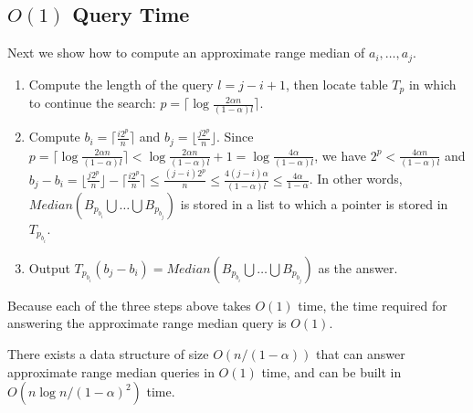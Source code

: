 \documentclass{llncs}
\begin{document}
\subsection{$O(1)$ Query Time}
Next we show how to compute an approximate range median of
$a_i,\ldots,a_j$.
\begin{enumerate}
\item Compute the length of the query $l=j-i+1$, then locate table $T_p$ in which to 
continue the search: $p=\lceil \log\frac{2 \alpha n}{(1-\alpha)l} \rceil$.
\item Compute $b_i=\lceil \frac{i 2^p}{n} \rceil$ and $b_j=\lfloor
  \frac{j 2^p}{n} \rfloor$. Since 
$p=\lceil \log\frac{2 \alpha n}{(1-\alpha)l}\rceil < \log\frac{2
  \alpha n}{(1-\alpha)l}+ 1 = \log\frac{4 \alpha}{(1-\alpha)l}$, 
we have $2^p < \frac{4 \alpha n}{(1-\alpha)l}$ and
$b_j - b_i = \lfloor \frac{j 2^p}{n} \rfloor - \lceil \frac{i 2^p}{n}
 \rceil \leq \frac{(j-i)2^p}{n} \leq \frac{4(j-i)\alpha}{(1-\alpha)l}
 \leq \frac{4 \alpha}{1-\alpha} $. In other words, $Median(B_{p_{b_i}} 
\bigcup \ldots \bigcup B_{p_{b_j}}) $ 
is stored in a list to which a pointer is stored in $T_{p_{b_i}}$.
\item Output $T_{p_{b_i}}(b_j-b_i)=Median(B_{p_{b_i}} \bigcup \ldots
  \bigcup B_{p_{b_j}}) $ as the answer.
\end{enumerate}
Because each of the three steps above takes $O(1)$ time, the time required 
for answering the approximate range median query is $O(1)$. 

\begin{theorem}
There exists a data structure of size $O(n/(1- \alpha))$ that can
answer 
approximate range median queries
in $O(1)$ time, and can be built in $O(n\log n /(1-\alpha)^2)$ time.  
\end{theorem}




\end{document}
